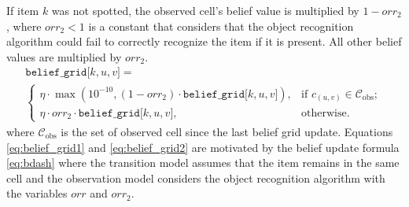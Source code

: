 If item $k$ was not spotted, the observed cell's belief value is multiplied by $1 - orr_2$, where $orr_2 < 1$ is a constant that considers that the object recognition algorithm could fail to correctly recognize the item if it is present. All other belief values are multiplied by $orr_2$. 
%
\begin{multline}\label{eq:belief_grid2}
    \texttt{belief\_grid[$k, u, v$]} =\\ 
    \begin{cases} 
        \eta \cdot\max\left(10^{-10}, (1 -  orr_2) \cdot \texttt{belief\_grid[$k, u, v$]}\right), &\text{if }c_{(u,v)} \in \mathcal{C}_\text{obs};\\
        \eta \cdot orr_2 \cdot \texttt{belief\_grid[$k, u, v$]}, &\text{otherwise.}
    \end{cases}
\end{multline}
%
where $\mathcal{C}_\text{obs}$ is the set of observed cell since the last belief grid update. Equations \ref{eq:belief_grid1} and \ref{eq:belief_grid2} are motivated by the belief update formula \ref{eq:bdash} where the transition model assumes that the item remains in the same cell and the observation model considers the object recognition algorithm with the variables $orr$ and $orr_2$. 
%
